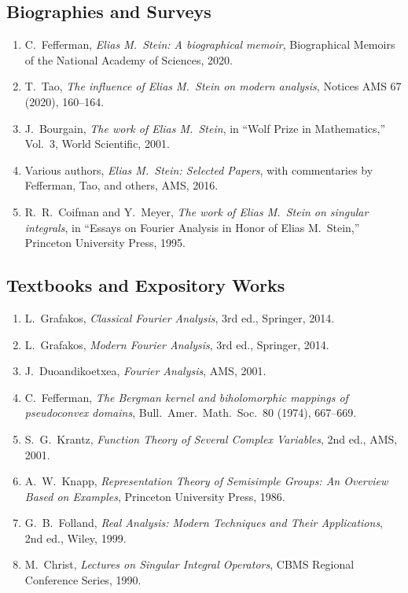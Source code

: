 \subsection*{Biographies and Surveys}
\begin{enumerate}
    \item C.\ Fefferman, \textit{Elias M.\ Stein: A biographical memoir}, Biographical Memoirs of the National Academy of Sciences, 2020.
    \item T.\ Tao, \textit{The influence of Elias M.\ Stein on modern analysis}, Notices AMS 67 (2020), 160--164.
    \item J.\ Bourgain, \textit{The work of Elias M.\ Stein}, in ``Wolf Prize in Mathematics,'' Vol.\ 3, World Scientific, 2001.
    \item Various authors, \textit{Elias M.\ Stein: Selected Papers}, with commentaries by Fefferman, Tao, and others, AMS, 2016.
    \item R.\ R.\ Coifman and Y.\ Meyer, \textit{The work of Elias M.\ Stein on singular integrals}, in ``Essays on Fourier Analysis in Honor of Elias M.\ Stein,'' Princeton University Press, 1995.
\end{enumerate}

\subsection*{Textbooks and Expository Works}
\begin{enumerate}
    \item L.\ Grafakos, \textit{Classical Fourier Analysis}, 3rd ed., Springer, 2014.
    \item L.\ Grafakos, \textit{Modern Fourier Analysis}, 3rd ed., Springer, 2014.
    \item J.\ Duoandikoetxea, \textit{Fourier Analysis}, AMS, 2001.
    \item C.\ Fefferman, \textit{The Bergman kernel and biholomorphic mappings of pseudoconvex domains}, Bull.\ Amer.\ Math.\ Soc.\ 80 (1974), 667--669.
    \item S.\ G.\ Krantz, \textit{Function Theory of Several Complex Variables}, 2nd ed., AMS, 2001.
    \item A.\ W.\ Knapp, \textit{Representation Theory of Semisimple Groups: An Overview Based on Examples}, Princeton University Press, 1986.
    \item G.\ B.\ Folland, \textit{Real Analysis: Modern Techniques and Their Applications}, 2nd ed., Wiley, 1999.
    \item M.\ Christ, \textit{Lectures on Singular Integral Operators}, CBMS Regional Conference Series, 1990.
\end{enumerate}


